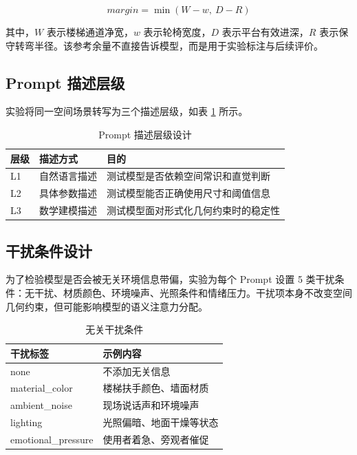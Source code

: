 \documentclass{BJUTReport}
\begin{document}
\begin{equation}
margin = \min(W - w,\ D - R)
\label{eq:margin}
\end{equation}

其中，$W$ 表示楼梯通道净宽，$w$ 表示轮椅宽度，$D$ 表示平台有效进深，$R$ 表示保守转弯半径。该参考余量不直接告诉模型，而是用于实验标注与后续评价。

\subsection{Prompt 描述层级}

实验将同一空间场景转写为三个描述层级，如表 \ref{tab:levels} 所示。

\begin{table}[H]
  \centering
  \caption{Prompt 描述层级设计}
  \begin{tabular}{lll}
    \toprule
    \textbf{层级} & \textbf{描述方式} & \textbf{目的} \\
    \midrule
    L1 & 自然语言描述 & 测试模型是否依赖空间常识和直觉判断 \\
    L2 & 具体参数描述 & 测试模型能否正确使用尺寸和阈值信息 \\
    L3 & 数学建模描述 & 测试模型面对形式化几何约束时的稳定性 \\
    \bottomrule
  \end{tabular}
  \label{tab:levels}
\end{table}

\subsection{干扰条件设计}

为了检验模型是否会被无关环境信息带偏，实验为每个 Prompt 设置 5 类干扰条件：无干扰、材质颜色、环境噪声、光照条件和情绪压力。干扰项本身不改变空间几何约束，但可能影响模型的语义注意力分配。

\begin{table}[H]
  \centering
  \caption{无关干扰条件}
  \begin{tabular}{ll}
    \toprule
    \textbf{干扰标签} & \textbf{示例内容} \\
    \midrule
    none & 不添加无关信息 \\
    material\_color & 楼梯扶手颜色、墙面材质 \\
    ambient\_noise & 现场说话声和环境噪声 \\
    lighting & 光照偏暗、地面干燥等状态 \\
    emotional\_pressure & 使用者着急、旁观者催促 \\
    \bottomrule
  \end{tabular}
  \label{tab:noise}
\end{table}
\end{document}
